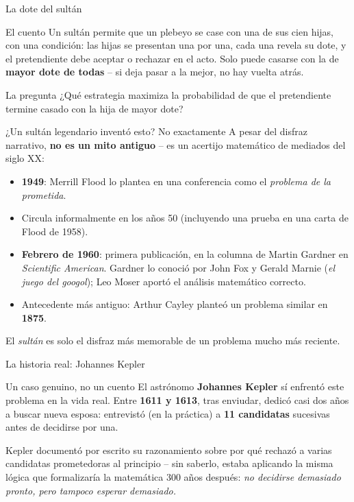 \documentclass[aspectratio=169,10pt]{beamer}
\begin{document}
\begin{frame}{La dote del sultán}
  \begin{block}{El cuento}
    Un sultán permite que un plebeyo se case con una de sus cien
    hijas, con una condición: las hijas se presentan una por una, cada
    una revela su dote, y el pretendiente debe aceptar o rechazar en
    el acto. Solo puede casarse con la de \textbf{mayor dote de
    todas} -- si deja pasar a la mejor, no hay vuelta atrás.
  \end{block}
  \begin{alertblock}{La pregunta}
    ¿Qué estrategia maximiza la probabilidad de que el pretendiente
    termine casado con la hija de mayor dote?
  \end{alertblock}
\end{frame}

\begin{frame}{¿Un sultán legendario inventó esto? No exactamente}
  A pesar del disfraz narrativo, \textbf{no es un mito antiguo} -- es
  un acertijo matemático de mediados del siglo XX:
  \begin{itemize}
    \item \textbf{1949}: Merrill Flood lo plantea en una conferencia
      como el \emph{problema de la prometida}.
    \item Circula informalmente en los años 50 (incluyendo una prueba
      en una carta de Flood de 1958).
    \item \textbf{Febrero de 1960}: primera publicación, en la columna
      de Martin Gardner en \emph{Scientific American}. Gardner lo
      conoció por John Fox y Gerald Marnie (\emph{el juego del googol});
      Leo Moser aportó el análisis matemático correcto.
    \item Antecedente más antiguo: Arthur Cayley planteó un problema
      similar en \textbf{1875}.
  \end{itemize}
  El \emph{sultán} es solo el disfraz más memorable de un problema mucho
  más reciente.
\end{frame}

\begin{frame}{La historia real: Johannes Kepler}
  \begin{block}{Un caso genuino, no un cuento}
    El astrónomo \textbf{Johannes Kepler} sí enfrentó este problema en
    la vida real. Entre \textbf{1611 y 1613}, tras enviudar, dedicó
    casi dos años a buscar nueva esposa: entrevistó (en la práctica)
    a \textbf{11 candidatas} sucesivas antes de decidirse por una.
  \end{block}
  Kepler documentó por escrito su razonamiento sobre por qué rechazó a
  varias candidatas prometedoras al principio -- sin saberlo, estaba
  aplicando la misma lógica que formalizaría la matemática 300 años
  después: \emph{no decidirse demasiado pronto, pero tampoco esperar
  demasiado.}
\end{frame}
\end{document}

